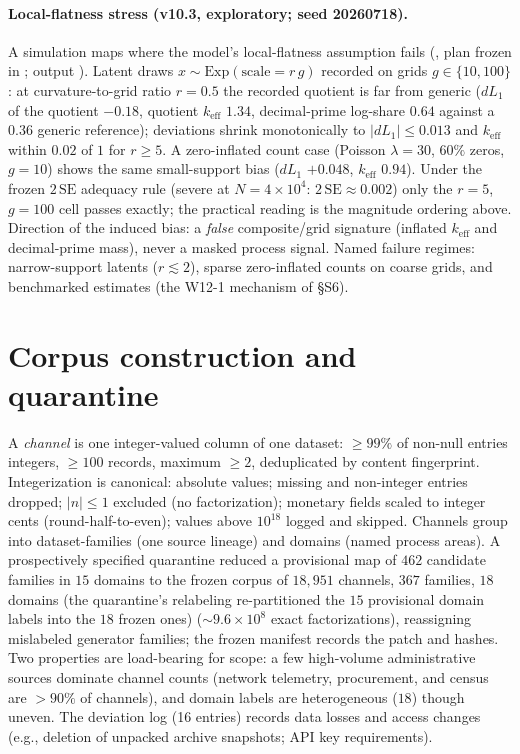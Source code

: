\documentclass[12pt]{article}
\newcommand{\keff}{k_{\mathrm{eff}}}
\begin{document}
\paragraph{Local-flatness stress (v10.3, exploratory; seed 20260718).}
A simulation maps where the model's local-flatness assumption fails
(, plan frozen in ;
output ).
Latent draws $x \sim \mathrm{Exp}(\mathrm{scale} = r\,g)$ recorded on grids
$g \in \{10, 100\}$: at curvature-to-grid ratio $r = 0.5$ the recorded
quotient is far from generic ($dL_1$ of the quotient $-0.18$, quotient
$\keff$ $1.34$, decimal-prime log-share $0.64$ against a $0.36$ generic
reference); deviations shrink monotonically to $|dL_1| \le 0.013$ and
$\keff$ within $0.02$ of $1$ for $r \ge 5$. A zero-inflated count case
(Poisson $\lambda = 30$, $60\%$ zeros, $g = 10$) shows the same
small-support bias ($dL_1$ $+0.048$, $\keff$ $0.94$). Under the frozen
$2\,\mathrm{SE}$ adequacy rule (severe at $N = 4\times10^4$: $2\,\mathrm{SE}
\approx 0.002$) only the $r = 5$, $g = 100$ cell passes exactly; the
practical reading is the magnitude ordering above. Direction of the induced
bias: a \emph{false} composite/grid signature (inflated $\keff$ and
decimal-prime mass), never a masked process signal. Named failure regimes:
narrow-support latents ($r \lesssim 2$), sparse zero-inflated counts on
coarse grids, and benchmarked estimates (the W12-1 mechanism of \S S6).

\section{Corpus construction and quarantine}
\label{s:corpus}

A \emph{channel} is one integer-valued column of one dataset: $\ge 99\%$ of
non-null entries integers, $\ge 100$ records, maximum $\ge 2$, deduplicated by
content fingerprint. Integerization is canonical: absolute values; missing and
non-integer entries dropped; $|n| \le 1$ excluded (no factorization); monetary
fields scaled to integer cents (round-half-to-even); values above $10^{18}$
logged and skipped. Channels group into dataset-families (one source lineage)
and domains (named process areas). A prospectively specified quarantine reduced a
provisional map of $462$ candidate families in $15$ domains to the frozen
corpus of $18{,}951$ channels, $367$ families, $18$ domains (the
quarantine's relabeling re-partitioned the $15$ provisional domain labels
into the $18$ frozen ones)
(${\sim}9.6\times10^8$ exact factorizations), reassigning mislabeled
generator families; the frozen manifest records the patch and hashes. Two
properties are load-bearing for scope: a few high-volume administrative
sources dominate channel counts (network telemetry, procurement, and census
are $>90\%$ of channels), and domain labels are heterogeneous ($18$) though
uneven. The deviation log (16 entries) records data losses and access changes
(e.g., deletion of unpacked archive snapshots; API key requirements).
\end{document}
